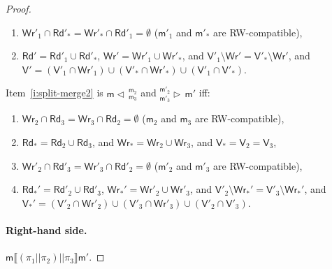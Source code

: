 \documentclass{llncs}
\newcommand{\modl}{\mathsf m}
\newcommand{\mrg}[3]{ ^{#2}_{#3} \triangleright \, #1 }
\newcommand{\pll}{ {||} }							%
\newcommand{\splt}[3]{ #1 \triangleleft \, ^{#2}_{#3} }
\newcommand{\readset}{\mathsf{Rd}}
\newcommand{\valuset}{\mathsf{V}}
\newcommand{\writeset}{\mathsf{Wr}}
\newcommand{\intPgm}[1]{\llbracket #1 \rrbracket}
\begin{document}
\begin{proof}
\begin{enumerate}[resume]
    
    \item $\writeset'_1 \cap \readset'_* = \writeset'_* \cap \readset'_1 = \emptyset$ ($\modl'_1$ and $\modl'_*$ are RW-compatible),
    \item $\readset' = \readset'_1 \cup \readset'_*$, $\writeset' = \writeset'_1 \cup \writeset'_*$, and $\valuset'_1 \setminus \writeset' = \valuset'_* \setminus \writeset'$, and $\valuset' = (\valuset'_1 \cap \writeset'_1) \cup (\valuset'_* \cap \writeset'_*) \cup (\valuset'_1 \cap \valuset'_*) $. 
\end{enumerate}
Item~\ref{i:split-merge2} is $\splt{\modl}{\modl_2} {\modl_3} $ and $\mrg{\modl'}{\modl'_2} {\modl'_3} $ iff:
\begin{enumerate}[resume]
\item
  $\writeset_2 \cap \readset_3 = \writeset_3 \cap \readset_2 = \emptyset$ ($\modl_2$ and $\modl_3$ are RW-compatible),
  \item 
    $\readset_* = \readset_2 \cup \readset_3 $, and $\writeset_* = \writeset_2 \cup \writeset_3$, and $\valuset_* = \valuset_2 = \valuset_3$,

    
    \item $\writeset'_2 \cap \readset'_3 = \writeset'_3 \cap \readset'_2 = \emptyset$ ($\modl'_2$ and $\modl'_3$ are RW-compatible),
    \item\label{i:lhslast} $\readset_*' = \readset'_2 \cup \readset'_3$, $\writeset_*' = \writeset'_2 \cup \writeset'_3$, and $\valuset'_2 \setminus \writeset_*' = \valuset'_3 \setminus \writeset_*'$, and $\valuset_*' = (\valuset'_2 \cap \writeset'_2) \cup (\valuset'_3 \cap \writeset'_3) \cup (\valuset'_2 \cap \valuset'_3) $. 
\end{enumerate}


\paragraph{Right-hand side.} $\modl \intPgm{ (\pi_1 \pll \pi_2) \pll \pi_3 } \modl'$.


\end{proof}
\end{document}
